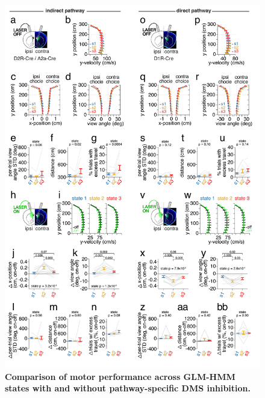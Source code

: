 \begin{figure}[t!]
\vspace{-0.2cm}
  \begin{center}
    \includegraphics[width=0.90\linewidth]{ch7-appendix1/appendix1-figures/ExtData_Fig10.pdf}
    \caption[Comparison of motor performance across GLM-HMM states with and without pathway-specific DMS inhibition]{\textbf{Comparison of motor performance across GLM-HMM states with and without pathway-specific DMS inhibition.} }
    \label{fig:ap1:ext10}
  \end{center}
\end{figure}
